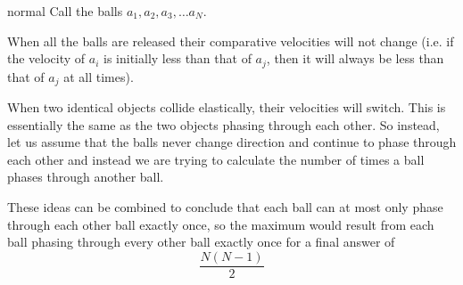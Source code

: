 \begin{solution}{normal}
Call the balls $a_1,a_2,a_3,\dots a_N$. \vspace{3mm}

When all the balls are released their comparative velocities will not change (i.e. if the velocity of $a_i$ is initially less than that of $a_j$, then it will always be less than that of $a_j$ at all times). \vspace{3mm}

When two identical objects collide elastically, their velocities will switch. This is essentially the same as the two objects phasing through each other. So instead, let us assume that the balls never change direction and continue to phase through each other and instead we are trying to calculate the number of times a ball phases through another ball. \vspace{3mm}

These ideas can be combined to conclude that each ball can at most only phase through each other ball exactly once, so the maximum would result from each ball phasing through every other ball exactly once for a final answer of $$\boxed{\frac{N(N-1)}{2}}$$
\end{solution}